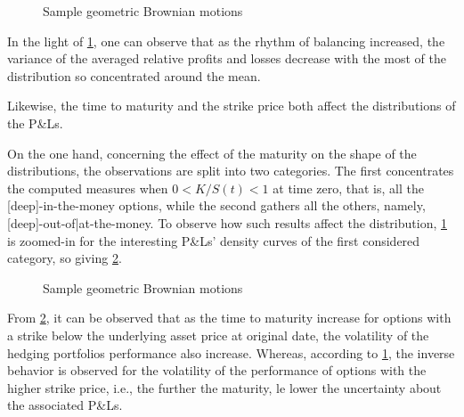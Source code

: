 \documentclass[12pt]{report}
\begin{document}
\begin{figure}[h]
  \centering
  
  \caption{Sample geometric Brownian motions}
  \label{p:analysis:mjd:pl:dist:big}
\end{figure}
         

In the light of \cref{p:analysis:mjd:pl:dist:big}, one can observe that as the rhythm of balancing increased, the variance of the averaged relative profits and losses decrease with the most of the distribution so concentrated around the mean.

Likewise,  the time to maturity and the strike price both affect the distributions of the P\&Ls.
%

On the one hand, concerning the effect of the maturity on the shape of the distributions, the observations are split into two categories.
The first concentrates the computed measures when $0 < K/S(t) < 1$ at time zero, that is, all the [deep]-in-the-money options, while the second gathers all the others, namely, [deep]-out-of|at-the-money. 
To observe how such results affect the distribution, \cref{p:analysis:mjd:pl:dist:big} is zoomed-in for the interesting P\&Ls' density curves of the first considered category, so giving \cref{p:analysis:mjd:pl:dist:in}.


\begin{figure}[h]
  \centering
  
  \caption{Sample geometric Brownian motions}
  \label{p:analysis:mjd:pl:dist:in}
\end{figure}

From \cref{p:analysis:mjd:pl:dist:in}, it can be observed that as the time to maturity increase for options with a strike below the underlying asset price at original date, the volatility of the hedging portfolios performance also increase.
Whereas, according to \cref{p:analysis:mjd:pl:dist:big}, the inverse behavior is observed for the volatility of the performance of options with the higher strike price, i.e., the further the maturity, le lower the uncertainty about the associated P\&Ls.
\end{document}
